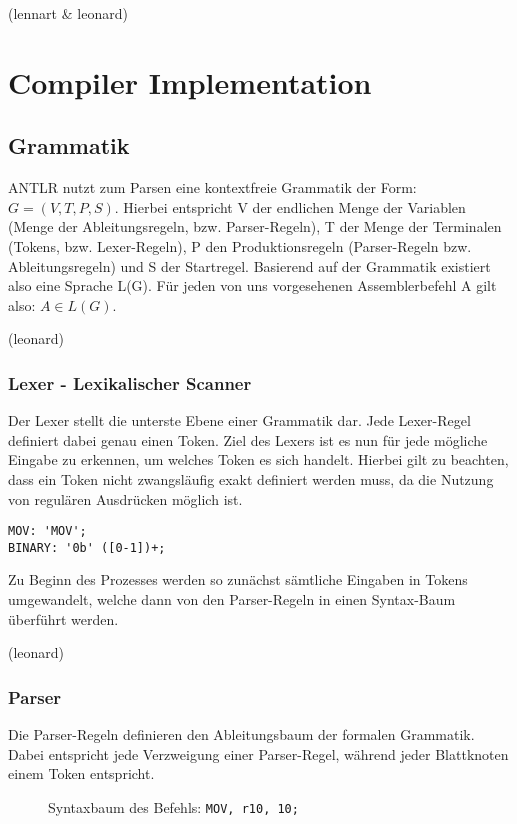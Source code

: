 \documentclass[paper=a4,fontsize=12pt,twocolumn]{scrreprt}
\begin{document}
(lennart \& leonard)

\section{Compiler Implementation}

\subsection{Grammatik}
ANTLR nutzt zum Parsen eine kontextfreie Grammatik der Form: $G = (V, T, P, S)$. Hierbei entspricht V der endlichen Menge der Variablen (Menge der Ableitungsregeln, bzw. Parser-Regeln), T der Menge der Terminalen (Tokens, bzw. Lexer-Regeln), P den Produktionsregeln (Parser-Regeln bzw. Ableitungsregeln) und S der Startregel. Basierend auf der Grammatik existiert also eine Sprache L(G). Für jeden von uns vorgesehenen Assemblerbefehl A gilt also: $A \in L(G)$. 

(leonard)

\subsubsection{Lexer - Lexikalischer Scanner}
Der Lexer stellt die unterste Ebene einer Grammatik dar.
Jede Lexer-Regel definiert dabei genau einen Token.
Ziel des Lexers ist es nun für jede mögliche Eingabe zu erkennen, um welches Token es sich handelt.
Hierbei gilt zu beachten, dass ein Token nicht zwangsläufig exakt definiert werden muss, da die Nutzung von regulären Ausdrücken möglich ist.
\begin{lstlisting}
MOV: 'MOV';
BINARY: '0b' ([0-1])+;
\end{lstlisting}
Zu Beginn des Prozesses werden so zunächst sämtliche Eingaben in Tokens umgewandelt, welche dann von den Parser-Regeln in einen Syntax-Baum überführt werden.

(leonard)

\subsubsection{Parser}
Die Parser-Regeln definieren den Ableitungsbaum der formalen Grammatik.
Dabei entspricht jede Verzweigung einer Parser-Regel, während jeder Blattknoten einem Token entspricht.

\begin{figure}[h]
\centering
\caption{Syntaxbaum des Befehls: \texttt{MOV, r10, 10;}}
\end{figure}
\end{document}
